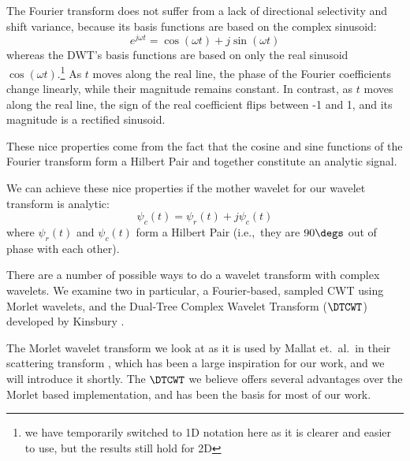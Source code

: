   The Fourier transform does not suffer from a lack of directional selectivity
  and shift variance, because its basis functions are based on the complex
  sinusoid: 
  \begin{equation} 
    e^{j\omega t} = \cos(\omega t) + j\sin(\omega t)
  \end{equation} 
  whereas the DWT's basis functions are based on only the real
  sinusoid $\cos(\omega t).$\footnote{we have temporarily switched to 1D
  notation here as it is clearer and easier to use, but the results still hold
  for 2D} As $t$ moves along the real line, the phase of the
  Fourier coefficients change linearly, while their magnitude remains constant. In
  contrast, as $t$ moves along the real line, the sign of the real coefficient
  flips between -1 and 1, and its magnitude is a rectified sinusoid.

  These nice properties come from the fact that the cosine and sine functions of the
  Fourier transform form a Hilbert Pair and together constitute an 
  analytic signal.

  We can achieve these nice properties if the mother wavelet for our wavelet
  transform is analytic:
  \begin{equation}
    \psi_{c}(t) = \psi_{r}(t) + j\psi_{c}(t) \label{eq:ch2:complex_wavelet}
  \end{equation}
  where $\psi_{r}(t)$ and $\psi_{c}(t)$ form a Hilbert Pair (i.e.,\ they are
  $90\degs$ out of phase with each other).

  There are a number of possible ways to do a wavelet transform with complex
  wavelets. We examine two in particular, a Fourier-based, sampled CWT using
  Morlet wavelets, and the Dual-Tree Complex Wavelet Transform ($\DTCWT$)
  developed by Kinsbury \cite{kingsbury_wavelet_1997, kingsbury_dual-tree_1998,
  kingsbury_dual-tree_1998-1,  kingsbury_image_1999, kingsbury_shift_1999,
  kingsbury_dual-tree_2000, kingsbury_complex_2001, selesnick_dual-tree_2005}.

  The Morlet wavelet transform we look at as it is used by 
  Mallat et.\ al.\ in their scattering transform
  \cite{bruna_classification_2011, bruna_invariant_2013, bruna_scattering_2013,
  oyallon_generic_2013, oyallon_deep_2015, sifre_rotation_2013,
  sifre_rigid-motion_2014, sifre_rigid-motion_2014-1, sifre_scatnet_2013}, which
  has been a large inspiration for our work, and we will introduce it shortly. 
  The $\DTCWT$ we believe offers
  several advantages over the Morlet based implementation, and has been the
  basis for most of our work.

